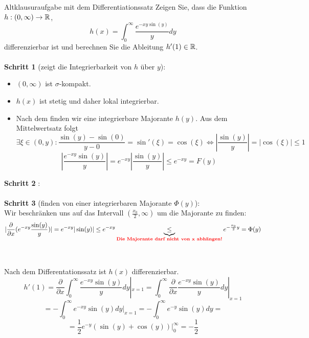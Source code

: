 \begin{Beispiel}{Altklausuraufgabe mit dem Differentiationssatz}
    Zeigen Sie, dass die Funktion $h:(0,\infty)\rightarrow \mathbb{R}$,
    $$h(x)=\int_0^\infty \frac{e^{-xy \sin(y)}}{y}dy$$
differenzierbar ist und berechnen Sie die Ableitung $h'(1)\in\mathbb{R}$. \\ \\
\textbf{Schritt 1} (zeigt die Integrierbarkeit von $h$ über $y$): \\
\begin{itemize}
    \item $(0,\infty)$ ist $\sigma$-kompakt.
    \item $h(x)$ ist stetig und daher lokal integrierbar.
    \item Nach dem  finden wir eine integrierbare Majorante $h(y)$.  Aus dem Mittelwertsatz folgt $$\exists \xi \in (0,y): \frac{\sin(y)-\sin(0)}{y-0}=\sin'(\xi)=\cos(\xi)\iff |\frac{\sin(y)}{y}|=|\cos(\xi)|\leq 1$$
    $$|\frac{e^{-xy}\sin(y)}{y}|=e^{-xy}|\frac{\sin(y)}{y}|\leq e^{-xy}=F(y)$$
\end{itemize}
\textbf{Schritt 2} :\\ \\
\textbf{Schritt 3} (finden von einer integrierbaren Majorante $\Phi(y)$): \\
Wir beschränken uns auf das Intervall $(\frac{x_0}{2},\infty)$ um die Majorante zu finden:
$$|\frac{\partial}{\partial x}(e^{-xy}\frac{\sin(y)}{y})|=e^{-xy}|\sin(y)|\leq e^{-xy}\underbrace{\leq}_{\text{\textcolor{red}{\textbf{Die Majorante darf nicht von x abhängen!}}}} e^{-\frac{x_0}{2}y}=\Phi(y)$$ \\ \\
Nach dem Differentationssatz ist $h(x)$ differenzierbar.
$$h'(1)=\frac{\partial}{\partial x}\int_0^\infty \frac{e^{-xy}\sin(y)}{y}dy|_{x=1}=\int_0^\infty \frac{\partial}{\partial x}\frac{e^{-xy}\sin(y)}{y}dy|_{x=1}$$
$$=-\int_0^\infty e^{-xy}\sin(y)dy|_{x=1}=-\int_0^\infty e^{-y}\sin(y)dy=$$
$$=\frac{1}{2}e^{-y}(\sin(y)+\cos(y))|_0^\infty=-\frac{1}{2}$$
\end{Beispiel}

